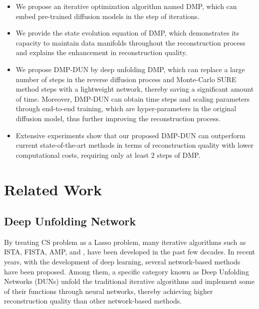 \documentclass[10pt,twocolumn,letterpaper]{article}
\begin{document}
\begin{itemize}[leftmargin=2ex,topsep=0.25ex]
	\item We propose an iterative optimization algorithm named DMP, which can embed pre-trained diffusion models in the step of iterations.
	\item We provide the state evolution equation of DMP, which demonstrates its capacity to maintain data manifolds throughout the reconstruction process and explains the enhancement in reconstruction quality.
	\item We propose DMP-DUN by deep unfolding DMP, which can replace a large number of steps in the reverse diffusion process and Monte-Carlo SURE method steps with a lightweight network, thereby saving a significant amount of time. Moreover, DMP-DUN can obtain time steps and scaling parameters through end-to-end training, which are hyper-parameters in the original diffusion model, thus further improving the reconstruction process.
	\item Extensive experiments show that our proposed DMP-DUN can outperform current state-of-the-art methods in terms of reconstruction quality with lower computational costs, requiring only at least 2 steps of DMP.
\end{itemize}



\section{Related Work}
\subsection{Deep Unfolding Network}
By treating CS problem as a Lasso problem, many iterative algorithms such as ISTA\cite{Daubechies2003AnIT},  FISTA\cite{beck2009fast}, AMP\cite{Donoho2009MessagepassingAF}, and \etc\cite{Becker2009NESTAAF, afonso2010augmented}, have been developed in the past few decades. In recent years, with the development of deep learning, several network-based methods\cite{kulkarni2016reconnet, shi2017deep, xu2018lapran, shi2019scalable, ye2021csformer, fan2022global} have been proposed. Among them, a specific category known as Deep Unfolding Networks (DUNs)\cite{DBLP:conf/icml/GregorL10, DBLP:conf/nips/MetzlerMB17, yang2018admm, zhang2018ista, zhang2020amp, you2021coast, shen2022transcs, song2021memory, Song2023OptimizationInspiredCT, DBLP:journals/ijcv/ChenSXZ23, guoCPPNet2024, wangUFCNet2024, DBLP:journals/tmm/CuiFZZ24, DBLP:journals/tmm/KongCH24} unfold the traditional iterative algorithms and implement some of their functions through neural networks, thereby achieving higher reconstruction quality than other network-based methods.
\end{document}
